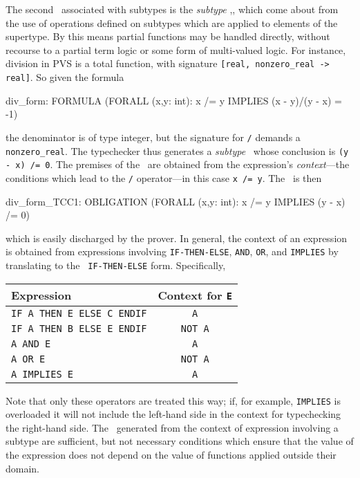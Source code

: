 The second \tcc\ associated with subtypes is the \emph{subtype}
\tcc,, which come about from the use
of operations defined on subtypes which are applied to elements of the
supertype.  By this means partial functions may be handled directly,
without recourse to a partial term logic or some form of multi-valued
logic.  For instance, division in PVS is a total function, with signature
{\tt [real, nonzero\_real -> real]}.  So given the formula
\begin{pvsex}
  div_form: FORMULA (FORALL (x,y: int):
                      x /= y IMPLIES (x - y)/(y - x) = -1)
\end{pvsex}
%
the denominator is of type integer, but the signature for {\tt /} demands
a {\tt nonzero\_real}.  The typechecker thus generates a \emph{subtype}
\tcc\ whose conclusion is {\tt (y - x) /= 0}.  The premises of the \tcc\
are obtained from the expression's \emph{context}---the conditions which
lead to the {\tt /} operator---in this case {\tt x /= y}.  The \tcc\ is
then
\begin{pvsex}
  div_form_TCC1: OBLIGATION
    (FORALL (x,y: int): x /= y IMPLIES (y - x) /= 0)
\end{pvsex}
which is easily discharged by the prover.  In general, the context of an
expression is obtained from expressions involving {\tt IF-THEN-ELSE},
{\tt AND}, {\tt OR}, and {\tt IMPLIES} by translating to the {\tt
IF-THEN-ELSE} form.  Specifically,
\begin{center}
\begin{tabular}{|lc|} \hline
Expression & Context for {\tt E} \\ \hline
{\tt IF A THEN E ELSE C ENDIF} & {\tt A} \\
{\tt IF A THEN B ELSE E ENDIF} & {\tt NOT A} \\
{\tt A AND E} & {\tt A} \\
{\tt A OR E} & {\tt NOT A} \\
{\tt A IMPLIES E} & {\tt A} \\ \hline
\end{tabular}
\end{center}
Note that only these operators are treated this way; if, for example,
\texttt{IMPLIES} is overloaded it will not include the left-hand side in
the context for typechecking the right-hand side.  The \tccs\ generated
from the context of expression involving a subtype are sufficient, but not
necessary conditions which ensure that the value of the expression does
not depend on the value of functions applied outside their domain.

